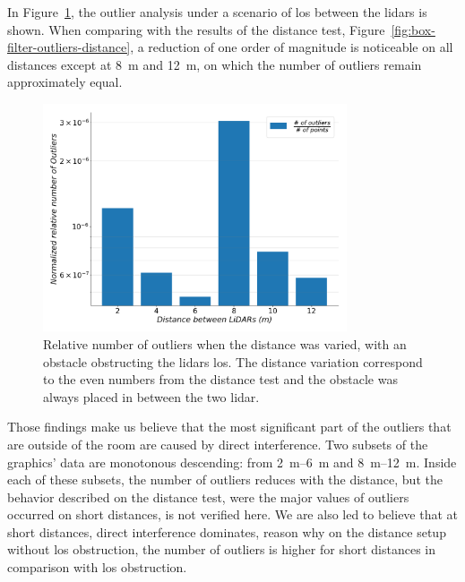 In Figure~\ref{fig:box-filter-outliers-LOS}, the outlier analysis under a scenario of \ac{los} between the \acp{lidar} is shown. When comparing with the results of the distance test, Figure~\ref{fig:box-filter-outliers-distance}, a reduction of one order of magnitude is noticeable on all distances except at \SI{8}{\meter} and \SI{12}{\meter}, on which the number of outliers remain approximately equal. 

\begin{figure}[!ht]
\centering
\includegraphics[width=0.8\textwidth]{img/lidar-interference/box-filtering/interference-box-filter-outliers-LOS.png}
\caption[Relative number of outliers when the \acp{lidar} \ac{los} is obstructed and the distance between the \acp{lidar} is varied, on \ac{irislab}.]{Relative number of outliers when the distance was varied, with an obstacle obstructing the \acp{lidar} \ac{los}. The distance variation correspond to the even numbers from the distance test and the obstacle was always placed in between the two \ac{lidar}.}
\label{fig:box-filter-outliers-LOS}
\end{figure}

Those findings make us believe that the most significant part of the outliers that are outside of the room are caused by direct interference. Two subsets of the graphics' data are monotonous descending: from \SIrange{2}{6}{\meter} and \SIrange{8}{12}{\meter}. Inside each of these subsets, the number of outliers reduces with the distance, but the behavior described on the distance test, were the major values of outliers occurred on short distances, is not verified here. We are also led to believe that at short distances, direct interference dominates, reason why on the distance setup without \ac{los} obstruction, the number of outliers is higher for short distances in comparison with \ac{los} obstruction.

